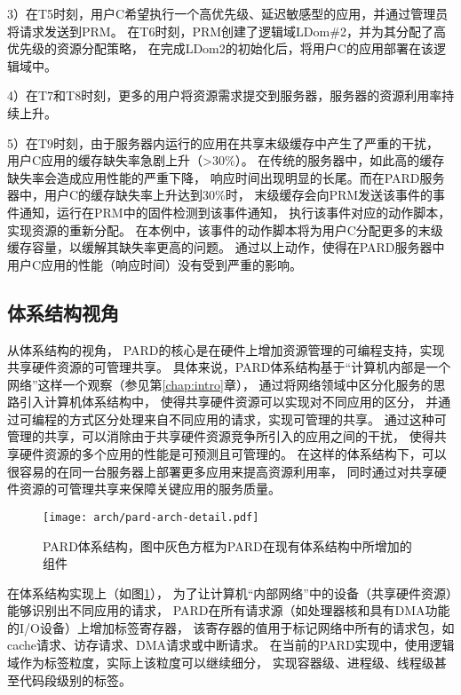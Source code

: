 3）在T5时刻，用户C希望执行一个高优先级、延迟敏感型的应用，并通过管理员将请求发送到PRM。
在T6时刻，PRM创建了逻辑域LDom\#2，并为其分配了高优先级的资源分配策略，
在完成LDom2的初始化后，将用户C的应用部署在该逻辑域中。

4）在T7和T8时刻，更多的用户将资源需求提交到服务器，服务器的资源利用率持续上升。

5）在T9时刻，由于服务器内运行的应用在共享末级缓存中产生了严重的干扰，
用户C应用的缓存缺失率急剧上升（>30\%）。
在传统的服务器中，如此高的缓存缺失率会造成应用性能的严重下降，
响应时间出现明显的长尾。而在PARD服务器中，用户C的缓存缺失率上升达到30\%时，
末级缓存会向PRM发送该事件的事件通知，运行在PRM中的固件检测到该事件通知，
执行该事件对应的动作脚本，实现资源的重新分配。
在本例中，该事件的动作脚本将为用户C分配更多的末级缓存容量，以缓解其缺失率更高的问题。
通过以上动作，使得在PARD服务器中用户C应用的性能（响应时间）没有受到严重的影响。


\subsection{体系结构视角}

从体系结构的视角，
PARD的核心是在硬件上增加资源管理的可编程支持，实现共享硬件资源的可管理共享。
具体来说，PARD体系结构基于``计算机内部是一个网络''这样一个观察（参见第\ref{chap:intro}章），
通过将网络领域中区分化服务的思路引入计算机体系结构中，
使得共享硬件资源可以实现对不同应用的区分，
并通过可编程的方式区分处理来自不同应用的请求，实现可管理的共享。
通过这种可管理的共享，可以消除由于共享硬件资源竞争所引入的应用之间的干扰，
使得共享硬件资源的多个应用的性能是可预测且可管理的。
在这样的体系结构下，可以很容易的在同一台服务器上部署更多应用来提高资源利用率，
同时通过对共享硬件资源的可管理共享来保障关键应用的服务质量。

\begin{figure}[b]
  \centering
  \texttt{[image: arch/pard-arch-detail.pdf]}
  \caption[PARD体系结构]{PARD体系结构，图中灰色方框为PARD在现有体系结构中所增加的组件}
  \label{fig:pard-arch-detail}
\end{figure}

在体系结构实现上（如图\ref{fig:pard-arch-detail}），
为了让计算机``内部网络''中的设备（共享硬件资源）能够识别出不同应用的请求，
PARD在所有请求源（如处理器核和具有DMA功能的I/O设备）上增加标签寄存器，
该寄存器的值用于标记网络中所有的请求包，如cache请求、访存请求、DMA请求或中断请求。
在当前的PARD实现中，使用逻辑域作为标签粒度，实际上该粒度可以继续细分，
实现容器级、进程级、线程级甚至代码段级别的标签。

